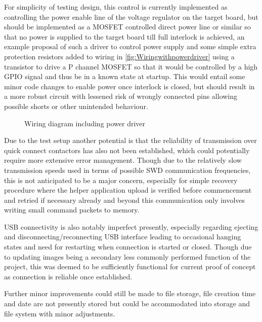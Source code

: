  For simplicity of testing design, this control is currently implemented as controlling the power enable line of the voltage regulator on the target board, but should  be implemented as a MOSFET controlled direct power line or similar so that no power is supplied to the target board till full interlock is achieved, an example proposal of such a driver to control power supply and some simple extra protection resistors added to wiring in \autoref{fig:Wiringwithpowerdriver} using a transistor to drive a P channel MOSFET so that it would be controlled by a high GPIO signal and thus be in a known state at startup. This would entail some minor code changes to enable power once interlock is closed, but should result in a more robust circuit with lessened risk of wrongly connected pins allowing possible shorts or other unintended behaviour.

\begin{figure}[ht]
	\centering
	\caption{Wiring diagram including power driver}
	\label{fig:Wiringwithpowerdriver}
\end{figure}

Due to the test setup another potential is that the reliability of transmission over quick connect contactors has also not been established, which could potentially require more extensive error management. Though due to the relatively slow transmission speeds used in terms of possible SWD communication frequencies, this is not anticipated to be a major concern, especially for simple recovery procedure where the helper application upload is verified before commencement and retried if necessary already and beyond this communication only involves writing small command packets to memory.

USB connectivity is also notably imperfect presently, especially regarding ejecting and disconnecting/reconnecting USB interface leading to occasional hanging states and need for restarting when connection is started or closed. Though due to updating images being a secondary less commonly performed function of the project, this was deemed to be sufficiently functional for current proof of concept as connection is reliable once established.

Further minor improvements could still be made to file storage, file creation time and date are not presently stored but could be accommodated into storage and file system with minor adjustments.